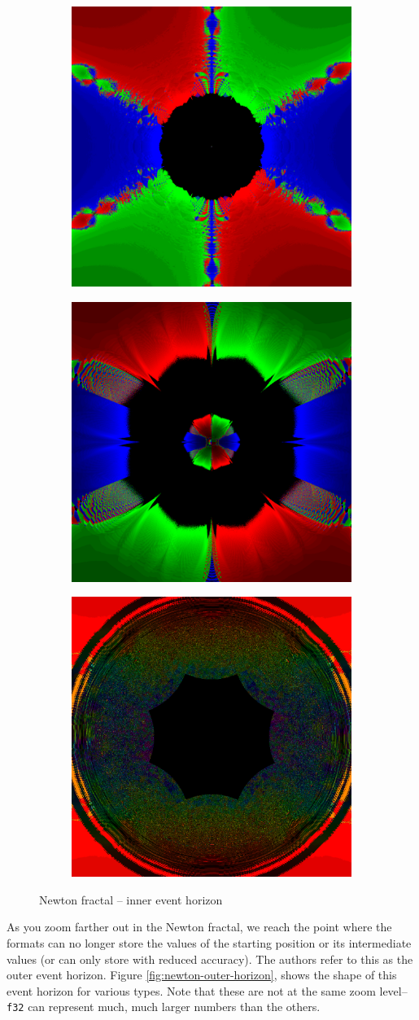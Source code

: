\documentclass[sigconf,authorversion,nonacm]{acmart}
\begin{document}
\begin{figure}
    \begin{subfigure}[P16]
        \centering
        \includegraphics[width=0.31\linewidth]{images/inner_horizon/P16_inner.png}
    \end{subfigure}
    \quad
    \begin{subfigure}[MaskedFloat<4,50>]
        \centering
        \includegraphics[width=0.31\linewidth]{images/inner_horizon/MaskedFloat_4_50_inner.png}
    \end{subfigure}
    \quad
    \begin{subfigure}[I20F12]
        \centering
        \includegraphics[width=0.31\linewidth]{images/inner_horizon/I20F12_inner.png}
    \end{subfigure}
    \caption{Newton fractal -- inner event horizon}
    \label{fig:newton-inner-horizon}
\end{figure}

As you zoom farther out in the Newton fractal, we reach the point where the formats can no longer 
store the values of the starting position or its intermediate
values (or can only store with reduced accuracy). The authors refer to this as the outer event horizon. 
Figure \ref{fig:newton-outer-horizon},
shows the shape of this event horizon for various types. Note that these are not at the same 
zoom level--\texttt{f32} can represent much, much larger numbers than the others. 
\end{document}
